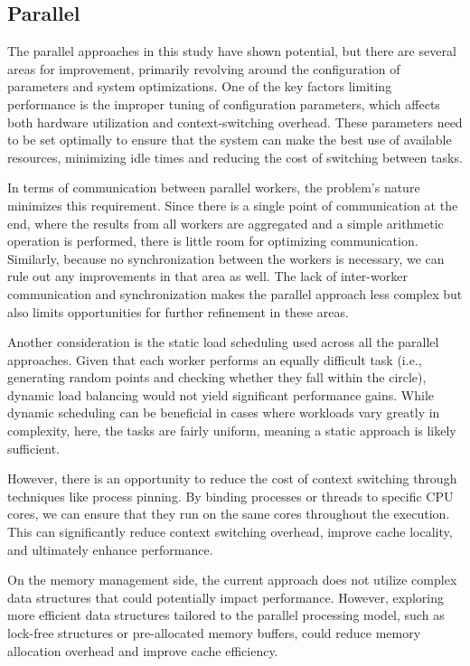 \documentclass[a4paper, oneside]{article}
\begin{document}
\subsection{Parallel}
The parallel approaches in this study have shown potential, but there are several areas for improvement, primarily revolving around the configuration of parameters and system optimizations. One of the key factors limiting performance is the improper tuning of configuration parameters, which affects both hardware utilization and context-switching overhead. These parameters need to be set optimally to ensure that the system can make the best use of available resources, minimizing idle times and reducing the cost of switching between tasks.

In terms of communication between parallel workers, the problem's nature minimizes this requirement. Since there is a single point of communication at the end, where the results from all workers are aggregated and a simple arithmetic operation is performed, there is little room for optimizing communication. Similarly, because no synchronization between the workers is necessary, we can rule out any improvements in that area as well. The lack of inter-worker communication and synchronization makes the parallel approach less complex but also limits opportunities for further refinement in these areas.

Another consideration is the static load scheduling used across all the parallel approaches. Given that each worker performs an equally difficult task (i.e., generating random points and checking whether they fall within the circle), dynamic load balancing would not yield significant performance gains. While dynamic scheduling can be beneficial in cases where workloads vary greatly in complexity, here, the tasks are fairly uniform, meaning a static approach is likely sufficient.

However, there is an opportunity to reduce the cost of context switching through techniques like process pinning. By binding processes or threads to specific CPU cores, we can ensure that they run on the same cores throughout the execution. This can significantly reduce context switching overhead, improve cache locality, and ultimately enhance performance.

On the memory management side, the current approach does not utilize complex data structures that could potentially impact performance. However, exploring more efficient data structures tailored to the parallel processing model, such as lock-free structures or pre-allocated memory buffers, could reduce memory allocation overhead and improve cache efficiency.
\end{document}
